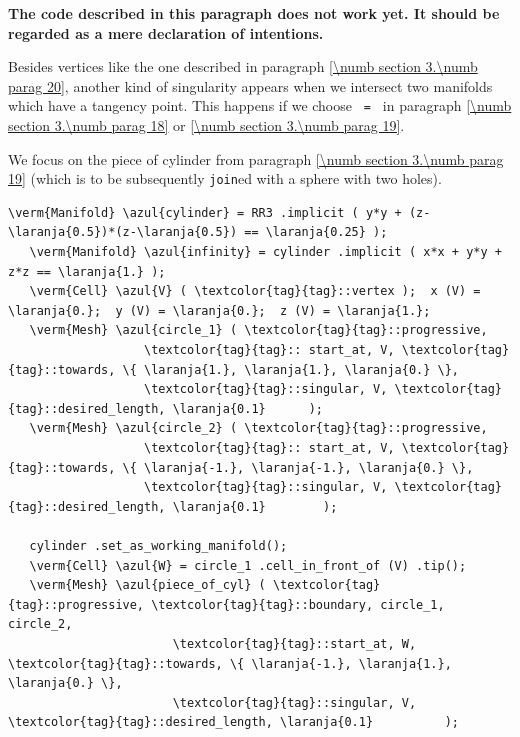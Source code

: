 {\normalfont\bfseries The code described in this paragraph does not work yet.
It should be regarded as a mere declaration of intentions.}
\medskip

Besides vertices like the one described in paragraph \ref{\numb section 3.\numb parag 20},
another kind of singularity appears when we intersect two manifolds which have a tangency point.
This happens if we choose {\small\tt{} = } in paragraph
\ref{\numb section 3.\numb parag 18} or \ref{\numb section 3.\numb parag 19}.

We focus on the piece of cylinder from paragraph \ref{\numb section 3.\numb parag 19}
(which is to be subsequently {\small\tt join}ed with a sphere with two holes).

\begin{Verbatim}[commandchars=\\\{\},formatcom=\small\tt,frame=single,
   label=code not working,rulecolor=\color{coment},
   baselinestretch=0.94,framesep=2mm                                  ]
   \verm{Manifold} \azul{cylinder} = RR3 .implicit ( y*y + (z-\laranja{0.5})*(z-\laranja{0.5}) == \laranja{0.25} );
   \verm{Manifold} \azul{infinity} = cylinder .implicit ( x*x + y*y + z*z == \laranja{1.} );
   \verm{Cell} \azul{V} ( \textcolor{tag}{tag}::vertex );  x (V) = \laranja{0.};  y (V) = \laranja{0.};  z (V) = \laranja{1.};
   \verm{Mesh} \azul{circle_1} ( \textcolor{tag}{tag}::progressive,
                   \textcolor{tag}{tag}:: start_at, V, \textcolor{tag}{tag}::towards, \{ \laranja{1.}, \laranja{1.}, \laranja{0.} \},
                   \textcolor{tag}{tag}::singular, V, \textcolor{tag}{tag}::desired_length, \laranja{0.1}      );
   \verm{Mesh} \azul{circle_2} ( \textcolor{tag}{tag}::progressive,
                   \textcolor{tag}{tag}:: start_at, V, \textcolor{tag}{tag}::towards, \{ \laranja{-1.}, \laranja{-1.}, \laranja{0.} \},
                   \textcolor{tag}{tag}::singular, V, \textcolor{tag}{tag}::desired_length, \laranja{0.1}        );

   cylinder .set_as_working_manifold();
   \verm{Cell} \azul{W} = circle_1 .cell_in_front_of (V) .tip();
   \verm{Mesh} \azul{piece_of_cyl} ( \textcolor{tag}{tag}::progressive, \textcolor{tag}{tag}::boundary, circle_1, circle_2,
                       \textcolor{tag}{tag}::start_at, W, \textcolor{tag}{tag}::towards, \{ \laranja{-1.}, \laranja{1.}, \laranja{0.} \},
                       \textcolor{tag}{tag}::singular, V, \textcolor{tag}{tag}::desired_length, \laranja{0.1}          );
\end{Verbatim}

